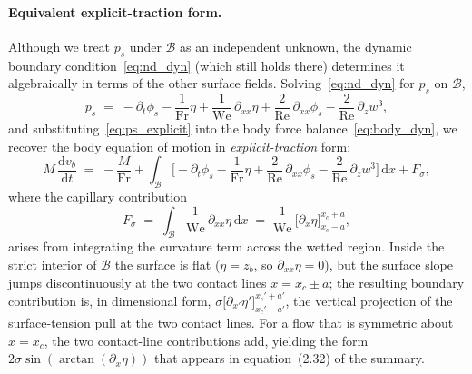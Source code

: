\documentclass{article}
\newcommand{\Fr}{\mathrm{Fr}}
\newcommand{\We}{\mathrm{We}}
\newcommand{\Rey}{\mathrm{Re}}
\begin{document}
\paragraph{Equivalent explicit-traction form.}
\label{sec:explicit_traction}
Although we treat $p_s$ under $\mathcal{B}$ as an independent unknown, the dynamic boundary condition~\eqref{eq:nd_dyn} (which still holds there) determines it algebraically in terms of the other surface fields.
Solving~\eqref{eq:nd_dyn} for $p_s$ on $\mathcal{B}$,
\begin{equation}
    p_s \;=\; -\partial_t \phi_s - \frac{1}{\Fr}\eta + \frac{1}{\We}\,\partial_{xx}\eta + \frac{2}{\Rey}\,\partial_{xx}\phi_s - \frac{2}{\Rey}\,\partial_z w^3, \label{eq:ps_explicit}
\end{equation}
and substituting~\eqref{eq:ps_explicit} into the body force balance~\eqref{eq:body_dyn}, we recover the body equation of motion in \emph{explicit-traction} form:
\begin{equation}
    M\,\frac{\mathrm{d} v_b}{\mathrm{d} t} \;=\; -\frac{M}{\Fr} + \int_{\mathcal{B}}\!\!\bigg[-\partial_t \phi_s - \frac{1}{\Fr}\eta + \frac{2}{\Rey}\,\partial_{xx}\phi_s - \frac{2}{\Rey}\,\partial_z w^3\bigg]\,\mathrm{d} x + F_\sigma, \label{eq:body_dyn_explicit}
\end{equation}
where the capillary contribution
\begin{equation}
    F_\sigma \;=\; \int_{\mathcal{B}} \frac{1}{\We}\,\partial_{xx}\eta\,\mathrm{d} x \;=\; \frac{1}{\We}\,\big[\partial_x \eta\big]_{x_c - a}^{x_c + a}, \label{eq:F_sigma}
\end{equation}
arises from integrating the curvature term across the wetted region.
Inside the strict interior of $\mathcal{B}$ the surface is flat ($\eta = z_b$, so $\partial_{xx}\eta = 0$), but the surface slope jumps discontinuously at the two contact lines $x = x_c \pm a$; the resulting boundary contribution is, in dimensional form, $\sigma\big[\partial_{x'}\eta'\big]_{x_c'-a'}^{x_c'+a'}$, the vertical projection of the surface-tension pull at the two contact lines.
For a flow that is symmetric about $x = x_c$, the two contact-line contributions add, yielding the form $2\sigma \sin(\arctan(\partial_x \eta))$ that appears in equation~(2.32) of the summary.
\end{document}
